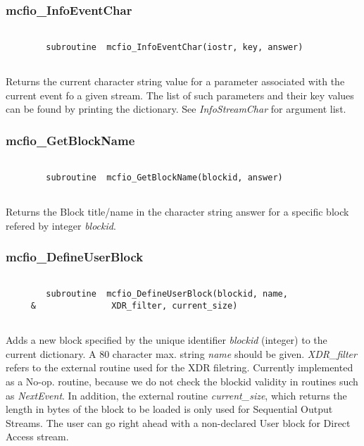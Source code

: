  
\subsubsection{mcfio\_InfoEventChar}

\begin{verbatim}

        subroutine  mcfio_InfoEventChar(iostr, key, answer)
    
\end{verbatim}

	Returns the current character string value for a parameter 
	associated with the current event fo a 
given stream. The list of such parameters and their key values 
can be found by printing the dictionary. See {\em InfoStreamChar} for
argument list. 

	
\subsubsection{mcfio\_GetBlockName}

\begin{verbatim}

        subroutine  mcfio_GetBlockName(blockid, answer)
    
\end{verbatim}

	Returns the Block title/name in the character string answer
	 for a specific block refered by integer {\em blockid}.
	  

\subsubsection{mcfio\_DefineUserBlock}

\begin{verbatim}

        subroutine  mcfio_DefineUserBlock(blockid, name,
     &               XDR_filter, current_size)
    
\end{verbatim}

Adds a new block specified by the unique identifier {\em blockid}  (integer) to
the current dictionary. A 80 character max.  string {\em name}  should be
given. {\em XDR\_filter} refers to the external routine used for the XDR
filetring.  Currently implemented as a No-op. routine, because we do not check 
the blockid validity in  routines such as  {\em NextEvent}.  In addition, the
external  routine {\em current\_size}, which returns the length in bytes of the
block to be loaded is only used for Sequential Output Streams.  The 
user can go right ahead with a non-declared User block for Direct Access
stream. 

